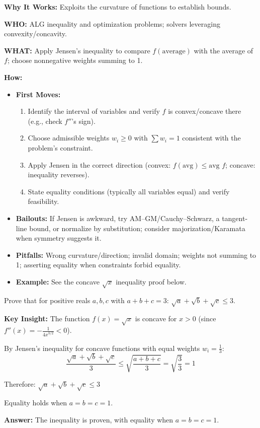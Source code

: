 \documentclass[12pt]{article}
\newenvironment{problem}[1]
{\begin{tcolorbox}[colback=blue!5!white,colframe=blue!75!black,title={#1}]}{\end{tcolorbox}}
\newenvironment{solution}
{\begin{tcolorbox}[colback=green!5!white,colframe=green!75!black,title={Solution}]}{\end{tcolorbox}}
\begin{document}
\textbf{Why It Works:} Exploits the curvature of functions to establish bounds.

\textbf{WHO:} ALG inequality and optimization problems; solvers leveraging convexity/concavity.

\textbf{WHAT:} Apply Jensen's inequality to compare $f(\text{average})$ with the average of $f$; choose nonnegative weights summing to 1.


\textbf{How:}
\begin{itemize}
    \item \textbf{First Moves:}
    \begin{enumerate}[nosep]
        \item Identify the interval of variables and verify $f$ is convex/concave there (e.g., check $f''$'s sign).
        \item Choose admissible weights $w_i\ge 0$ with $\sum w_i=1$ consistent with the problem's constraint.
        \item Apply Jensen in the correct direction (convex: $f(\text{avg})\le \text{avg }f$; concave: inequality reverses).
        \item State equality conditions (typically all variables equal) and verify feasibility.
    \end{enumerate}
    \item \textbf{Bailouts:} If Jensen is awkward, try AM–GM/Cauchy–Schwarz, a tangent-line bound, or normalize by substitution; consider majorization/Karamata when symmetry suggests it.
    \item \textbf{Pitfalls:} Wrong curvature/direction; invalid domain; weights not summing to 1; asserting equality when constraints forbid equality.
    \item \textbf{Example:} See the concave $\sqrt{x}$ inequality proof below.
\end{itemize}

\begin{problem}{Example: Proving an Inequality}
Prove that for positive reals $a, b, c$ with $a + b + c = 3$: $\sqrt{a} + \sqrt{b} + \sqrt{c} \leq 3$.
\end{problem}

\begin{solution}
\textbf{Key Insight:} The function $f(x) = \sqrt{x}$ is concave for $x > 0$ (since $f''(x) = -\frac{1}{4x^{3/2}} < 0$).

By Jensen's inequality for concave functions with equal weights $w_i = \frac{1}{3}$:
$$\frac{\sqrt{a} + \sqrt{b} + \sqrt{c}}{3} \leq \sqrt{\frac{a + b + c}{3}} = \sqrt{\frac{3}{3}} = 1$$

Therefore: $\sqrt{a} + \sqrt{b} + \sqrt{c} \leq 3$

Equality holds when $a = b = c = 1$.

\textbf{Answer:} The inequality is proven, with equality when $a = b = c = 1$.
\end{solution}
\end{document}
